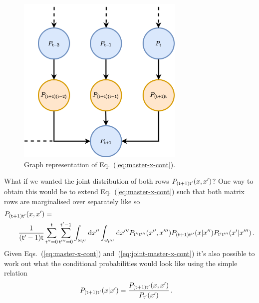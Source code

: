 \documentclass{book}
\begin{document}
\begin{figure}[h]
\centering
\includegraphics[width=8cm]{images/master-eq-graph.drawio.png}
\caption{Graph representation of Eq.~(\ref{eq:master-x-cont}).}
\label{fig:master-eqn}
\end{figure}

What if we wanted the joint distribution of both rows $P_{({\sf t}+1){\sf t}'}(x,x')$? One way to obtain this would be to extend Eq.~(\ref{eq:master-x-cont}) such that both matrix rows are marginalised over separately like so
\begin{align}
&P_{({\sf t}+1){\sf t}'}(x,x') = \nonumber \\
&\qquad \frac{1}{({\sf t}'-1){\sf t}}\sum_{{\sf t}''=0}^{{\sf t}}\sum_{{\sf t}'''=0}^{{\sf t}'-1}\int_{\omega_{{\sf t}''}}{\rm d}x''\int_{\omega_{{\sf t}'''}}{\rm d}x''' P_{{\sf t}''{\sf t}'''}(x'', x''') P_{({\sf t}+1){\sf t}''}(x\vert x'')P_{{\sf t}'{\sf t}'''}(x'\vert x''') \label{eq:joint-master-x-cont} \,.
\end{align}
Given Eqs.~(\ref{eq:master-x-cont}) and~(\ref{eq:joint-master-x-cont}) it's also possible to work out what the conditional probabilities would look like using the simple relation
\begin{align}
P_{({\sf t}+1){\sf t}'}(x\vert x') &= \frac{P_{({\sf t}+1){\sf t}'}(x,x')}{P_{{\sf t}'}(x')} \label{eq:cond-master-x-cont} \,.
\end{align}
\end{document}
